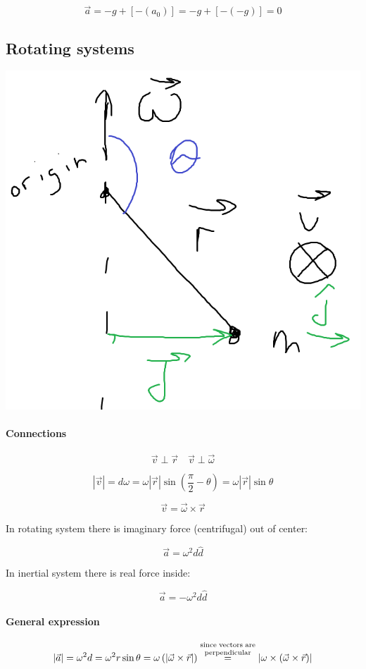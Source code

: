 $$\vec{a} = -g + \left[ - \left( a_0 \right)\right] = -g + \left[ - \left( -g \right)\right]  = 0$$

\subsection{Rotating systems}


\begin{center}
	\includegraphics[width=0.5\linewidth]{./lect6/pic1.png}
\end{center}

\paragraph{Connections}

$$\vec{v} \perp \vec{r} \quad \vec{v} \perp \vec{\omega}$$

$$\left| \vec{v} \right| = d \omega = \omega \left| \vec{r}  \right| \sin \left(\frac{\pi}{2} - \theta\right) = \omega \left| \vec{r}  \right| \sin \theta$$


$$\vec{v} = \vec{\omega} \times \vec{r}$$

In rotating system there is imaginary force (centrifugal) out of center:

$$\vec{a} = \omega ^ 2 d \hat{d} $$

In inertial system there is real force inside:

$$\vec{a} = - \omega^2 d \hat{d}$$


\paragraph{General expression}

$$\left| \vec{a} \right| = \omega^2 d = \omega^2 r \sin \theta = \omega\left(\left| \vec{\omega} \times 
\vec{r} \right|\right) \stackrel{\parbox{2cm}{\scriptsize  \centering since vectors are \\ perpendicular}}{=} \left| \omega \times \left( \vec{\omega} \times 
\vec{r} \right) \right|$$

